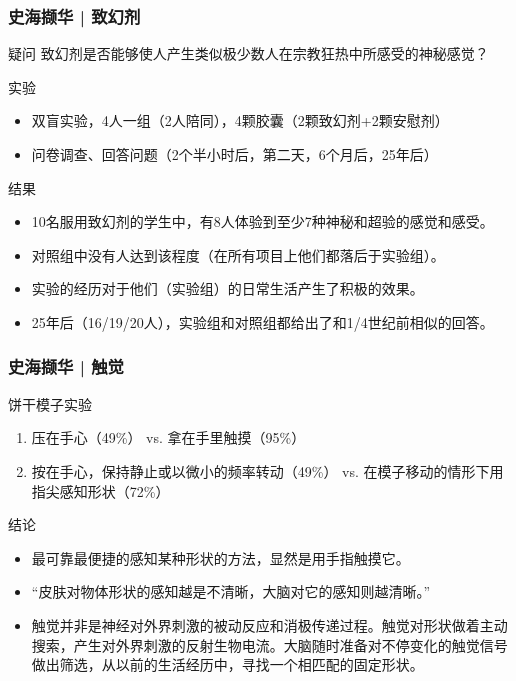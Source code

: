 \begin{frame}
  \frametitle{史海撷华 | 致幻剂}
  \vspace{-0.5em}
  \begin{block}{疑问}
    致幻剂是否能够使人产生类似极少数人在宗教狂热中所感受的神秘感觉？
  \end{block}
  \vspace{-0.5em}
  \pause
  \begin{block}{实验}
    \begin{itemize}
      \item 双盲实验，4人一组（2人陪同），4颗胶囊（2颗致幻剂+2颗安慰剂）
      \item 问卷调查、回答问题（2个半小时后，第二天，6个月后，25年后）
    \end{itemize}
  \end{block}
  \vspace{-0.5em}
  \pause
  \begin{block}{结果}
    \begin{itemize}
      \item 10名服用致幻剂的学生中，有8人体验到至少7种神秘和超验的感觉和感受。
      \item 对照组中没有人达到该程度（在所有项目上他们都落后于实验组）。
      \item 实验的经历对于他们（实验组）的日常生活产生了积极的效果。
      \item 25年后（16/19/20人），实验组和对照组都给出了和1/4世纪前相似的回答。
    \end{itemize}
  \end{block}
\end{frame}

\begin{frame}
  \frametitle{史海撷华 | 触觉}
  \begin{block}{饼干模子实验}
    \begin{enumerate}
      \item 压在手心（49\%） vs. 拿在手里触摸（95\%）
      \item 按在手心，保持静止或以微小的频率转动（49\%） vs. 在模子移动的情形下用指尖感知形状（72\%）
    \end{enumerate}
  \end{block}
  \pause
  \begin{block}{结论}
    \begin{itemize}
      \item 最可靠最便捷的感知某种形状的方法，显然是用手指触摸它。
      \item “皮肤对物体形状的感知越是不清晰，大脑对它的感知则越清晰。”
      \item 触觉并非是神经对外界刺激的被动反应和消极传递过程。触觉对形状做着主动搜索，产生对外界刺激的反射生物电流。大脑随时准备对不停变化的触觉信号做出筛选，从以前的生活经历中，寻找一个相匹配的固定形状。
    \end{itemize}
  \end{block}
\end{frame}

